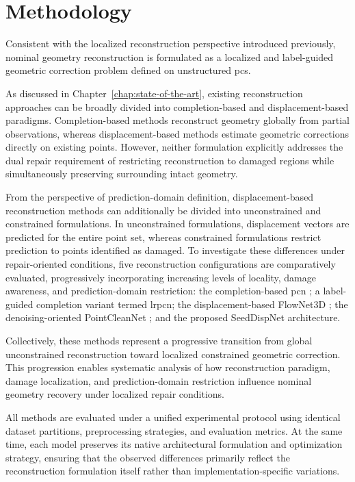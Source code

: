 \section{Methodology}
\label{sec:methods}

Consistent with the localized reconstruction perspective introduced previously, nominal geometry reconstruction is formulated as a localized and label-guided geometric correction problem defined on unstructured \acp{pc}.

As discussed in Chapter~\ref{chap:state-of-the-art}, existing reconstruction approaches can be broadly divided into completion-based and displacement-based paradigms. Completion-based methods reconstruct geometry globally from partial observations, whereas displacement-based methods estimate geometric corrections directly on existing points. However, neither formulation explicitly addresses the dual repair requirement of restricting reconstruction to damaged regions while simultaneously preserving surrounding intact geometry.

From the perspective of prediction-domain definition, displacement-based reconstruction methods can additionally be divided into unconstrained and constrained formulations. In unconstrained formulations, displacement vectors are predicted for the entire point set, whereas constrained formulations restrict prediction to points identified as damaged. To investigate these differences under repair-oriented conditions, five reconstruction configurations are comparatively evaluated, progressively incorporating increasing levels of locality, damage awareness, and prediction-domain restriction: the completion-based \ac{pcn} \cite{Yuan2019}; a label-guided completion variant termed \ac{lrpcn}; the displacement-based FlowNet3D \cite{FlowNet3D2019}; the denoising-oriented PointCleanNet \cite{Marie2019}; and the proposed SeedDispNet architecture.

Collectively, these methods represent a progressive transition from global unconstrained reconstruction toward localized constrained geometric correction. This progression enables systematic analysis of how reconstruction paradigm, damage localization, and prediction-domain restriction influence nominal geometry recovery under localized repair conditions.

All methods are evaluated under a unified experimental protocol using identical dataset partitions, preprocessing strategies, and evaluation metrics. At the same time, each model preserves its native architectural formulation and optimization strategy, ensuring that the observed differences primarily reflect the reconstruction formulation itself rather than implementation-specific variations.

